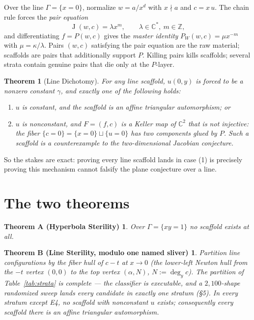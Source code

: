 \documentclass[11pt]{article}
\newtheorem{theorem}{Theorem}
\newtheorem*{theoremA}{Theorem A (Hyperbola Sterility)}
\newtheorem*{theoremB}{Theorem B (Line Sterility, modulo one named sliver)}
\newcommand{\C}{\mathbb{C}}
\newcommand{\J}{\operatorname{J}}
\begin{document}
Over the line $\Gamma = \{x=0\}$, normalize $w = a/x^{d}$ with $x \nmid a$
and $c = x\,u$. The chain rule forces the \emph{pair equation}
\[
\J(w, c) = \lambda x^{m}, \qquad \lambda \in \C^{*},\ m \in \mathbb{Z},
\]
and differentiating $f = P(w,c)$ gives the \emph{master identity}
$P_W(w, c) = \mu x^{-m}$ with $\mu = \kappa/\lambda$. Pairs $(w,c)$
satisfying the pair equation are the raw material; scaffolds are pairs that
additionally support $P$. Killing pairs kills scaffolds; several strata
contain genuine pairs that die only at the $P$-layer.

\begin{theorem}[Line Dichotomy]
For any line scaffold, $u(0,y)$ is forced to be a nonzero constant
$\gamma$, and exactly one of the following holds:
\begin{enumerate}
\item $u$ is constant, and the scaffold is an affine triangular
automorphism; or
\item $u$ is nonconstant, and $F = (f, c)$ is a Keller map of $\C^2$ that
is not injective: the fiber $\{c = 0\} = \{x = 0\} \sqcup \{u = 0\}$ has two
components glued by $P$. Such a scaffold \emph{is} a counterexample to the
two-dimensional Jacobian conjecture.
\end{enumerate}
\end{theorem}

So the stakes are exact: proving every line scaffold lands in case (1) is
precisely proving this mechanism cannot falsify the plane conjecture over a
line.

\section{The two theorems}

\begin{theoremA}
Over $\Gamma = \{xy = 1\}$ no scaffold exists at all.
\end{theoremA}

\begin{theoremB}
Partition line configurations by the fiber hull of $c - t$ at $x \to 0$
(the lower-left Newton hull from the $-t$ vertex $(0,0)$ to the top vertex
$(\alpha, N)$, $N := \deg_y c$). The partition of Table~\ref{tab:strata} is
complete --- the classifier is executable, and a $2{,}100$-shape randomized
sweep lands every candidate in exactly one stratum (\S5). In every stratum
except E4, no scaffold with nonconstant $u$ exists; consequently every
scaffold there is an affine triangular automorphism.
\end{theoremB}
\end{document}
